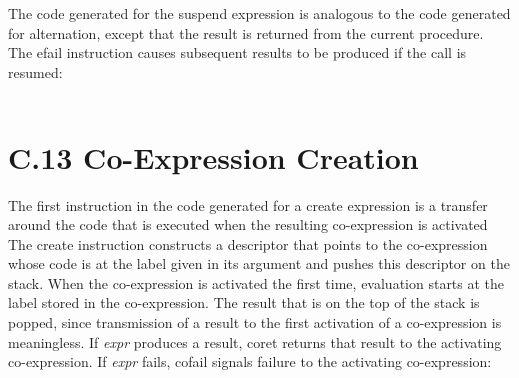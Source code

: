 \begin{noIndex}
\begin{center}
\begin{xtabular}{|m{1.9073598in}|m{2.75596in}|}
\end{xtabular}
\end{center}

\bigskip

\begin{center}
\tablelasttail{\hline}
\begin{xtabular}{|m{1.9073598in}|m{2.75596in}|}

\end{xtabular}
\end{center}

The code generated for the suspend expression is analogous to the code
generated for alternation, except that the result is returned from the
current procedure. The efail instruction causes subsequent results to
be produced if the call is resumed:

\begin{center}
\tablelasttail{\hline}
\begin{xtabular}{|m{1.9073598in}|m{2.75596in}|}

\end{xtabular}
\end{center}


\section{C.13 Co-Expression Creation}

The first instruction in the code generated for a create expression is
a transfer around the code that is executed when the resulting
co-expression is activated The create instruction constructs a
descriptor that points to the co-expression whose code is at the label
given in its argument and pushes this descriptor on the stack. When
the co-expression is activated the first time, evaluation starts at
the label stored in the co-expression. The result that is on the top
of the stack is popped, since transmission of a result to the first
activation of a co-expression is meaningless. If \textit{expr}
produces a result, coret returns that result to the activating
co-expression. If \textit{expr} fails, cofail signals failure to the
activating co-expression:


\end{noIndex}
